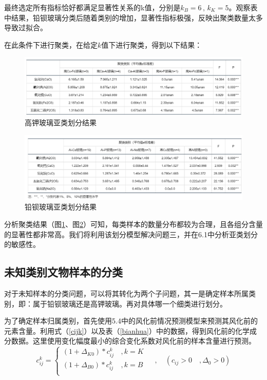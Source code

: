 \documentclass{my_paper}
\begin{document}
最终选定所有指标恰好都满足显著性关系的k值，分别是$k_B = 6\,,\,k_K = 5$。观察表中结果，铅钡玻璃分类后随着类别的增加，显著性指标极强，反映出聚类数量太多导致过拟合。

在此条件下进行聚类，在给定$k$值下进行聚类，得到以下结果：
\begin {figure}[h]
\centering %
\includegraphics[width=\textwidth]{kkres.png}
\caption{高钾玻璃亚类划分结果} %
\label{kkres}
\end {figure}
\begin {figure}[h]
\centering %
\includegraphics[width=\textwidth]{kbres.png}
\caption{铅钡玻璃亚类划分结果} %
\label{kbres}
\end {figure}

\newpage
分析聚类结果（图\ref{kkres}、图\ref{kbres}）可知，每类样本的数量分布都较为合理，且各组分含量的显著性都非常高。我们将利用该划分模型解决问题三，并在6.1中分析亚类划分的敏感性。

\subsection{未知类别文物样本的分类}

对于未知样本的分类问题，可以将其转化为两个子问题，其一是确定样本所属类别，即：属于铅钡玻璃还是高钾玻璃。再对具体哪一个细类进行划分。

为了确定样本归属类别，首先使用5.4中的风化前情况预测模型来预测其风化前的元素含量。利用式（\ref{cijk}）以及表（\ref{bianhua}）中的数据，得到风化前的化学成分数据。这里使用变化幅度最小的综合变化系数对风化前的样本含量进行预测。
$$    c_{ij}^k = \begin{cases}
  (1+\Delta_{K0})*c_{ij}^k&\,,k=K\\
  (1+\Delta_{B0})*c_{ij}^k&\,,k=B\\
\end{cases} \, \quad , \quad (c_{ij}>0\quad ,\Delta_0 > 0)$$
\end{document}
